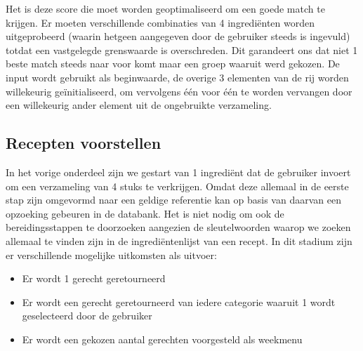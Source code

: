 \documentclass{hogent-article}
\begin{document}
Het is deze score die moet worden geoptimaliseerd om een goede match te krijgen. Er moeten verschillende combinaties van 4 ingrediënten worden uitgeprobeerd (waarin hetgeen aangegeven door de gebruiker steeds is ingevuld) totdat een vastgelegde grenswaarde is overschreden. Dit garandeert ons dat niet 1 beste match steeds naar voor komt maar een groep waaruit werd gekozen. De input wordt gebruikt als beginwaarde, de overige 3 elementen van de rij worden willekeurig geïnitialiseerd, om vervolgens één voor één te worden vervangen door een willekeurig ander element uit de ongebruikte verzameling. 

\subsection{Recepten voorstellen}%

In het vorige onderdeel zijn we gestart van 1 ingrediënt dat de gebruiker invoert om een verzameling van 4 stuks te verkrijgen. Omdat deze allemaal in de eerste stap zijn omgevormd naar een geldige referentie kan op basis van daarvan een opzoeking gebeuren in de databank. Het is niet nodig om ook de bereidingsstappen te doorzoeken aangezien de sleutelwoorden waarop we zoeken allemaal te vinden zijn in de ingrediëntenlijst van een recept. In dit stadium zijn er verschillende mogelijke uitkomsten als uitvoer:

\begin{itemize}
    \item Er wordt 1 gerecht geretourneerd
    \item Er wordt een gerecht geretourneerd van iedere categorie waaruit 1 wordt geselecteerd door de gebruiker
    \item Er wordt een gekozen aantal gerechten voorgesteld als weekmenu
\end{itemize}
\end{document}
